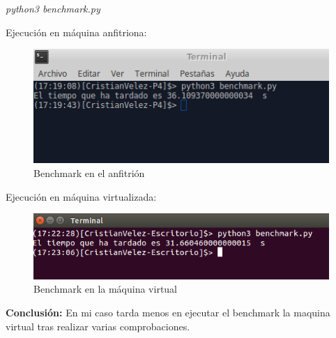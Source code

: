 \begin{center}
	\textit{python3 benchmark.py}
\end{center}

Ejecución en máquina anfitriona:

\begin{figure}[H] %
	\centering
	\includegraphics[scale=0.4]{pics/anfitrion}  %
	\caption{Benchmark en el anfitrión} \label{fig:anfi}
\end{figure}


Ejecución en máquina virtualizada:

\begin{figure}[H] %
	\centering
	\includegraphics[scale=0.4]{pics/virtual}  %
	\caption{Benchmark en la máquina virtual} \label{fig:anfi}
\end{figure}

\textbf{Conclusión: }En mi caso tarda menos en ejecutar el benchmark la maquina virtual tras realizar varias comprobaciones.




\grid
